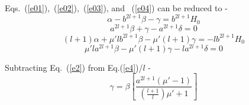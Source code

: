 



Eqs.~(\ref{e01}),~(\ref{e02}),~(\ref{e03}), and ~(\ref{e04}) can be reduced to -
\begin{equation}\label{e1}
\alpha- b^{2l+1}\beta-\gamma=b^{2l+1}H_0
\end{equation}
\begin{equation}\label{e2}
 a^{2l+1}\beta+\gamma-a^{2l+1}\delta =0
\end{equation}
\begin{equation}\label{e3}
(l+1)\alpha+\mu' l b^{2l+1}\beta-\mu'(l+1)\gamma=-lb^{2l+1}H_0
\end{equation}
\begin{equation}\label{e4}
\mu'l a^{2l+1}\beta -\mu'(l+1)\gamma- l a^{2l+1}\delta=0
\end{equation}

Subtracting Eq.~(\ref{e2}) from Eq.(\ref{e4})/$l$ -
\begin{equation}\label{g1}
\gamma=\beta \left[\frac{a^{2l+1}(\mu'-1)}{\left(\frac{l+1}{l}\right)\mu'+1}\right]
\end{equation}

